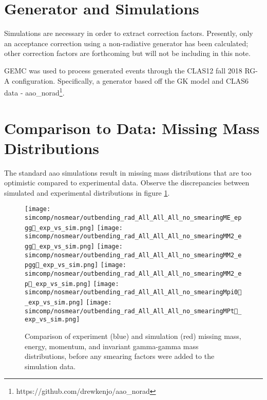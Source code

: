 \iffalse
NOTES TO SELF:
physics motivation
data sets before event selection
PID
exclusive cuts
results to show
1 slide of what needs to go from here to cross section
\fi

\section{Generator and Simulations}
    Simulations are necessary in order to extract correction factors. Presently, only an acceptance correction using a non-radiative generator has been calculated; other correction factors are forthcoming but will not be including in this note. 

    GEMC was used to process generated events through the CLAS12 fall 2018 RG-A configuration. Specifically, a generator based off the GK model and CLAS6 data - aao\_norad\footnote{https://github.com/drewkenjo/aao\_norad}. 
    

\section{Comparison to Data: Missing Mass Distributions}

The standard aao simulations result in missing mass distributions that are too optimistic compared to experimental data. Observe the discrepancies between simulated and experimental distributions in figure \ref{fig:bad}. 


\begin{figure}[hbt]
	\centering
	\texttt{[image: simcomp/nosmear/outbending\_rad\_All\_All\_All\_no\_smearingME\_epgg\_exp\_vs\_sim.png]}
	\texttt{[image: simcomp/nosmear/outbending\_rad\_All\_All\_All\_no\_smearingMM2\_egg\_exp\_vs\_sim.png]}
	\texttt{[image: simcomp/nosmear/outbending\_rad\_All\_All\_All\_no\_smearingMM2\_epgg\_exp\_vs\_sim.png]}
	\texttt{[image: simcomp/nosmear/outbending\_rad\_All\_All\_All\_no\_smearingMM2\_ep\_exp\_vs\_sim.png]}
	\texttt{[image: simcomp/nosmear/outbending\_rad\_All\_All\_All\_no\_smearingMpi0\_exp\_vs\_sim.png]}
	\texttt{[image: simcomp/nosmear/outbending\_rad\_All\_All\_All\_no\_smearingMPt\_exp\_vs\_sim.png]}
	
	\caption{Comparison of experiment (blue) and simulation (red) missing mass, energy, momentum, and invariant gamma-gamma mass distributions, before any smearing factors were added to the simulation data.}
	\label{fig:bad}
\end{figure}



